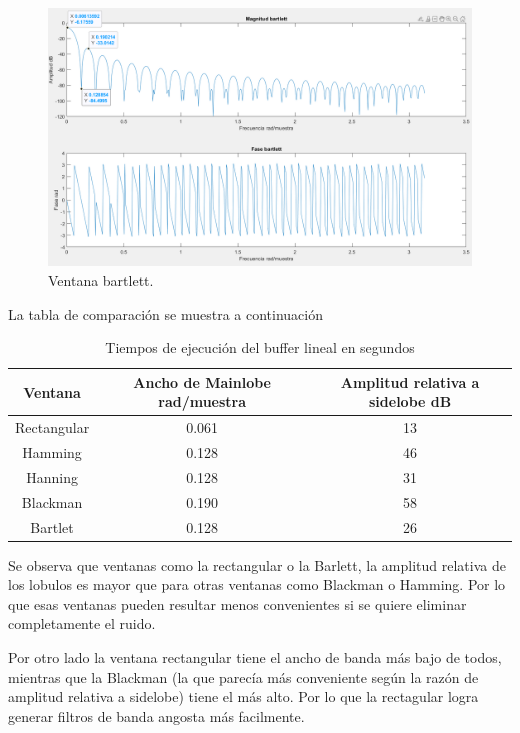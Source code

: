 \documentclass[letterpaper,onecolumn,10pt,journal,final]{IEEEtran}
\begin{document}
\begin{enumerate}[1)]
\begin{figure}[H]
    \end{figure}
    \begin{figure}[H]
        \centering
        \includegraphics[width=0.75 \linewidth]{Figuras/II_2)barlett_dB.png}
        \caption{Ventana bartlett.}
        \label{fig:II_2)barlett}
    \end{figure}
\end{enumerate}
La tabla de comparación se muestra a continuación
\begin{table}[H]
        \centering
        \begin{tabular}{|c|c|c|}
        \hline
            Ventana     & Ancho de Mainlobe rad/muestra & Amplitud relativa a sidelobe dB \\ \hline
            Rectangular & 0.061 & 13 \\
            Hamming     & 0.128 & 46 \\
            Hanning     & 0.128 & 31 \\
            Blackman    & 0.190 & 58 \\
            Bartlet     & 0.128 & 26 \\\hline
        \end{tabular}
        \caption{Tiempos de ejecución del buffer lineal en segundos}
        \label{tab:1}
\end{table}
    
Se observa que ventanas como la rectangular o la Barlett, la amplitud relativa de los lobulos es mayor que para otras ventanas como Blackman o Hamming. Por lo que esas ventanas pueden resultar menos convenientes si se quiere eliminar completamente el ruido.

Por otro lado la ventana rectangular tiene el ancho de banda más bajo de todos, mientras que la Blackman (la que parecía más conveniente según la razón de amplitud relativa a sidelobe) tiene el más alto. Por lo que la rectagular logra generar filtros de banda angosta más facilmente.
%
%
\end{document}

